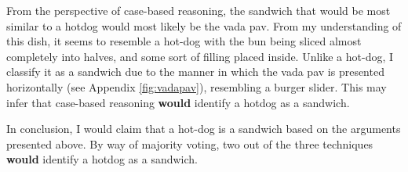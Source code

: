 From the perspective of case-based reasoning, the sandwich that would be most similar to a hotdog would most likely be the vada pav. From my understanding of this dish, it seems to resemble a hot-dog with the bun being sliced almost completely into halves, and some sort of filling placed inside. Unlike a hot-dog, I classify it as a sandwich due to the manner in which the vada pav is presented horizontally (see Appendix \ref{fig:vadapav}), resembling a burger slider. This may infer that case-based reasoning \textbf{would} identify a hotdog as a sandwich. 

In conclusion, I would claim that a hot-dog is a sandwich based on the arguments presented above. By way of majority voting, two out of the three techniques \textbf{would} identify a hotdog as a sandwich.
